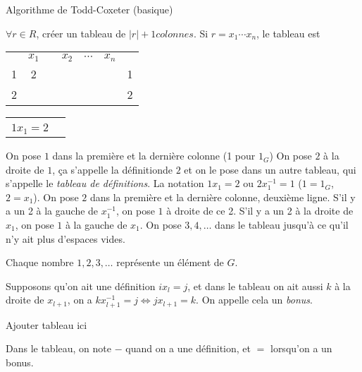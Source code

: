      \begin{algorithm}
       \caption{Algorithme de Todd-Coxeter (basique)}
       \label{alg:todd-coxeter-basique}
       \begin{algorithmic}
         \State $\forall r \in R$, créer un tableau de $|r|+1 colonnes$.
         \State Si $r = x_1 \cdots x_n$, le tableau est
         \begin{tabular}{ccccccc}
           & $x_1$ & & $x_2$ & $\cdots$ & $x_n$ & \\
            1 & 2 & & & & & 1 \\
            2 &   & & & & & 2
         \end{tabular}
         \begin{tabular}{cc}
           & \\
           $1x_1 = 2$ & 
         \end{tabular}
         \State On pose $1$ dans la première et la dernière colonne (1 pour $1_G$)
         \State On pose $2$ à la droite de $1$, ça s'appelle la \og définition\fg de $2$ et on le pose dans un
         autre tableau, qui s'appelle le \emph{tableau de définitions}.  La
         notation $1 x_1 = 2$ ou $2 x_1^{-1} = 1$ ($1 = 1_G$, $2 = x_1$).
         \State On pose $2$ dans la première et la dernière colonne, deuxième ligne.
         \State S'il y a un 2 à la gauche de $x_1^{-1}$, on pose $1$ à droite de ce 2.
         \State S'il y a un 2 à la droite de $x_1$, on pose $1$ à la gauche de $x_1$.
         \State On pose $3, 4, \ldots$ dans le tableau jusqu'à ce qu'il n'y ait plus d'espaces vides.
       \end{algorithmic} 
     \end{algorithm}
     

     \begin{rem} \label{rem:rem-1}
       Chaque nombre $1, 2, 3, \ldots$ représente un élément de $G$.
     \end{rem}
     

     \begin{rem} \label{rem:rem-2}
       Supposons qu'on ait une définition $i x_l = j$, et dans le tableau on ait aussi $k$ à la droite de
       $x_{l+1}$, on a $kx_{l+1}^{-1} = j \iff jx_{l+1} = k$. On appelle cela un \emph{bonus}. 
       \begin{center}
         Ajouter tableau ici
       \end{center}
       Dans le tableau, on note $-$ quand on a une définition, et $=$ lorsqu'on a un bonus.
     \end{rem}


